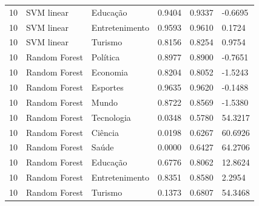 \begin{tabular}{llllll}
10 & SVM linear & Educação & 0.9404 & 0.9337 & -0.6695 \\
10 & SVM linear & Entretenimento & 0.9593 & 0.9610 & 0.1724 \\
10 & SVM linear & Turismo & 0.8156 & 0.8254 & 0.9754 \\
10 & Random Forest & Política & 0.8977 & 0.8900 & -0.7651 \\
10 & Random Forest & Economia & 0.8204 & 0.8052 & -1.5243 \\
10 & Random Forest & Esportes & 0.9635 & 0.9620 & -0.1488 \\
10 & Random Forest & Mundo & 0.8722 & 0.8569 & -1.5380 \\
10 & Random Forest & Tecnologia & 0.0348 & 0.5780 & 54.3217 \\
10 & Random Forest & Ciência & 0.0198 & 0.6267 & 60.6926 \\
10 & Random Forest & Saúde & 0.0000 & 0.6427 & 64.2706 \\
10 & Random Forest & Educação & 0.6776 & 0.8062 & 12.8624 \\
10 & Random Forest & Entretenimento & 0.8351 & 0.8580 & 2.2954 \\
10 & Random Forest & Turismo & 0.1373 & 0.6807 & 54.3468 \\
\hline
\end{tabular}
